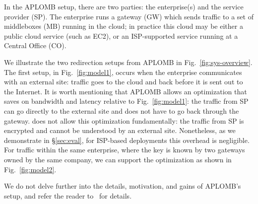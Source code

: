 In the APLOMB setup, there are two parties: the enterprise(s) and the service provider (SP).
The enterprise runs a gateway (GW) which sends traffic to a set of middleboxes (MB) running in the cloud; in practice this cloud may be either a public cloud service (such as EC2), or an ISP-supported service running at a Central Office (CO).

We illustrate the two redirection setups from APLOMB in Fig.~\ref{fig:sys-overview}.  The first setup, in Fig.~\ref{fig:model1},  occurs when the enterprise communicates with an external site: traffic goes to the cloud and back before it is sent out to the Internet. 
It is worth mentioning that APLOMB allows an optimization that saves on bandwidth and latency relative to Fig.~\ref{fig:model1}: the traffic from SP can go directly to the external site and does not have to go back through the gateway. \sys does not allow this optimization fundamentally: the traffic from SP is encrypted and cannot be understood by an external site. 
Nonetheless, as we demonstrate in \S\ref{sec:eval}, for ISP-based deployments this overhead is negligible.
For traffic within the same enterprise, where the key is known by two gateways owned by the same company, we can support the optimization as shown in Fig.~\ref{fig:model2}.

We do not delve further into the details, motivation, and gains of APLOMB's setup, and refer the reader to~\cite{aplomb} for details. 


